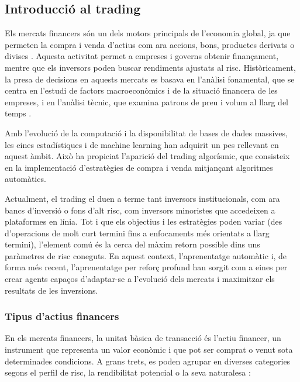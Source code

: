 \documentclass[12pt,a4paper,twoside]{book}
\begin{document}
\subsection{Introducció al trading}
\sloppy

Els mercats financers són un dels motors principals de l'economia global, ja que permeten la compra i venda d'actius com ara accions, bons, productes derivats o divises \cite{InvestopediaFinance}. Aquesta activitat permet a empreses i governs obtenir finançament, mentre que els inversors poden buscar rendiments ajustats al risc. Històricament, la presa de decisions en aquests mercats es basava en l'anàlisi fonamental, que se centra en l'estudi de factors macroeconòmics i de la situació financera de les empreses, i en l'anàlisi tècnic, que examina patrons de preu i volum al llarg del temps \cite{TradersBook}.

Amb l'evolució de la computació i la disponibilitat de bases de dades massives, les eines estadístiques i de machine learning han adquirit un pes rellevant en aquest àmbit. Això ha propiciat l'aparició del trading algorísmic, que consisteix en la implementació d'estratègies de compra i venda mitjançant algoritmes automàtics. 

Actualment, el trading el duen a terme tant inversors institucionals, com ara bancs d'inversió o fons d'alt risc, com inversors minoristes que accedeixen a plataformes en línia. Tot i que els objectius i les estratègies poden variar (des d'operacions de molt curt termini fins a enfocaments més orientats a llarg termini), l'element comú és la cerca del màxim retorn possible dins uns paràmetres de risc coneguts. En aquest context, l'aprenentatge automàtic i, de forma més recent, l'aprenentatge per reforç profund han sorgit com a eines per crear agents capaços d'adaptar-se a l'evolució dels mercats i maximitzar els resultats de les inversions.


\subsubsection{Tipus d'actius financers}
En els mercats financers, la unitat bàsica de transacció és l'actiu financer, un instrument que representa un valor econòmic i que pot ser comprat o venut sota determinades condicions. A grans trets, es poden agrupar en diverses categories segons el perfil de risc, la rendibilitat potencial o la seva naturalesa \cite{TypesOfInv}:
\end{document}
